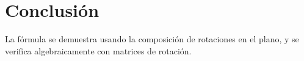 
\pagecolor{carne}

\newpage

\pagecolor{white}

\newpage

\pagecolor{carne}

\newpage

\pagecolor{white}

\newpage

\pagecolor{carne}

\newpage

\pagecolor{white}

\newpage

\pagecolor{carne}

\newpage

\pagecolor{white}

\newpage

\pagecolor{carne}

\newpage

\pagecolor{white}

\newpage

\pagecolor{white}
\section{Conclusión}\label{sec:conclusion}
La fórmula se demuestra usando la composición de rotaciones en el plano, y se verifica algebraicamente con matrices de rotación.



